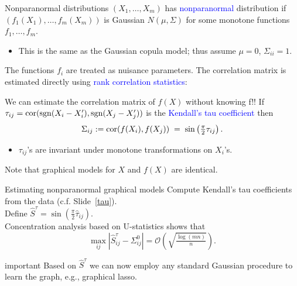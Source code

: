 \documentclass[11pt,handout,aspectratio=169,dvipsnames]{beamer}
\begin{document}
\begin{frame}[label=npn]{Nonparanormal distributions}
	$(X_1,\ldots,X_m)$ has \textcolor{blue}{nonparanormal} distribution if $(f_1(X_1),\ldots,f_m(X_m))$ is Gaussian $N(\mu,\Sigma)$ for some monotone functions $f_1,\ldots,f_m$.
	\begin{itemize}
		\item This is the same as the Gaussian copula model; thus assume $\mu=0$, $\Sigma_{ii}=1$.
	\end{itemize}	
The functions $f_i$ are treated as nuisance parameters. The correlation matrix is estimated directly using \textcolor{blue}{rank correlation statistics}:\\[.2cm]
	\begin{alertblock}{We can estimate the correlation matrix of $f(X)$ without knowing f!!}
		If $\tau_{ij}={\rm cor}({\rm sgn}(X_i-X_i'),{\rm sgn}(X_j-X_j'))$ is the \textcolor{blue}{Kendall's tau coefficient} then
	$$
	\Sigma_{ij}:={\rm cor}(f(X_i),f(X_j))\;=\;\sin\left(\tfrac{\pi}{2}\tau_{ij}\right).
	$$
	\vspace{-.8cm}
	\begin{itemize}
		\item $\tau_{ij}$'s are invariant under monotone transformations on $X_i$'s.
	\end{itemize}
	\end{alertblock}
Note that graphical models for $X$ and $f(X)$ are identical.
\end{frame}


\begin{frame}[label=npn2]{Estimating nonparanormal graphical models}
		Compute \alert{Kendall's tau} coefficients from the data (c.f. Slide~\ref{tau}).\\[4mm] 	
		Define $\hat S^\tau=\sin(\tfrac{\pi}{2}\hat\tau_{ij})$.\\[.3cm]
	Concentration analysis based on U-statistics shows that
	$$
	\max_{ij}|\hat S^\tau_{ij}-\Sigma^0_{ij}|=\mathcal O\left(\sqrt{\tfrac{\log(mn)}{n}}\right).
	$$
	\begin{beamercolorbox}[wd=\paperwidth,sep=5pt]{important}
		Based on $\hat S^\tau$ we can now employ any standard Gaussian procedure to learn the graph, e.g., graphical lasso.
	\end{beamercolorbox}

\end{frame}
\end{document}
